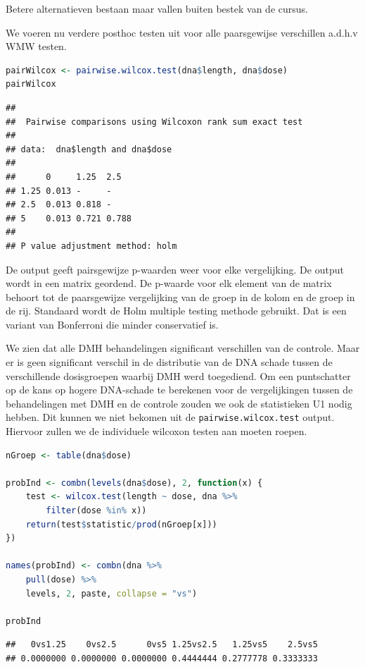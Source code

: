 \documentclass[
  12pt,dutch,coursenotes]{book}
\newcommand{\passthrough}[1]{#1}
\theoremstyle{definition}
\theoremstyle{definition}
\theoremstyle{definition}
\theoremstyle{definition}
\theoremstyle{remark}
\begin{document}
Betere alternatieven bestaan maar vallen buiten bestek van de cursus.

We voeren nu verdere posthoc testen uit voor alle paarsgewijse verschillen a.d.h.v WMW testen.

\begin{lstlisting}[language=R]
pairWilcox <- pairwise.wilcox.test(dna$length, dna$dose)
pairWilcox
\end{lstlisting}

\begin{lstlisting}
## 
##  Pairwise comparisons using Wilcoxon rank sum exact test 
## 
## data:  dna$length and dna$dose 
## 
##      0     1.25  2.5  
## 1.25 0.013 -     -    
## 2.5  0.013 0.818 -    
## 5    0.013 0.721 0.788
## 
## P value adjustment method: holm
\end{lstlisting}

De output geeft pairsgewijze p-waarden weer voor elke vergelijking. De output wordt in een matrix geordend.
De p-waarde voor elk element van de matrix behoort tot de paarsgewijze vergelijking van de groep in de kolom en de groep in de rij.
Standaard wordt de Holm multiple testing methode gebruikt. Dat is een variant van Bonferroni die minder conservatief is.

We zien dat alle DMH behandelingen significant verschillen van de controle.
Maar er is geen significant verschil in de distributie van de DNA schade tussen de verschillende dosisgroepen waarbij DMH werd toegediend.
Om een puntschatter op de kans op hogere DNA-schade te berekenen voor de vergelijkingen tussen de behandelingen met DMH en de controle zouden we ook de statistieken U1 nodig hebben.
Dit kunnen we niet bekomen uit de \passthrough{\lstinline!pairwise.wilcox.test!} output.
Hiervoor zullen we de individuele wilcoxon testen aan moeten roepen.

\begin{lstlisting}[language=R]
nGroep <- table(dna$dose)

probInd <- combn(levels(dna$dose), 2, function(x) {
    test <- wilcox.test(length ~ dose, dna %>%
        filter(dose %in% x))
    return(test$statistic/prod(nGroep[x]))
})

names(probInd) <- combn(dna %>%
    pull(dose) %>%
    levels, 2, paste, collapse = "vs")

probInd
\end{lstlisting}

\begin{lstlisting}
##   0vs1.25    0vs2.5      0vs5 1.25vs2.5   1.25vs5    2.5vs5 
## 0.0000000 0.0000000 0.0000000 0.4444444 0.2777778 0.3333333
\end{lstlisting}
\end{document}
